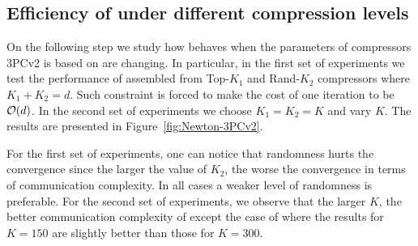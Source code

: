 \documentclass[11pt]{article}
\begin{document}
	\subsection{Efficiency of  under different compression levels}
	
	On the following step we study how  behaves when the parameters of compressors 3PCv2 is based on are changing. In particular, in the first set of experiments we test the performance of  assembled from Top-$K_1$ and Rand-$K_2$ compressors where $K_1+K_2=d$. Such constraint is forced to make the cost of one iteration to be $\mathcal{O}(d)$. In the second set of experiments we choose $K_1=K_2=K$ and vary $K$. The results are presented in Figure~\ref{fig:Newton-3PCv2}. 
	
	For the first set of experiments, one can notice that randomness hurts the convergence since the larger the value of $K_2$, the worse the convergence in terms of communication complexity. In all cases a weaker level of randomness is preferable. For the second set of experiments, we observe that the larger $K$, the better communication complexity of  except the case of  where the results for $K=150$  are slightly better than those for $K=300$. 
	
\end{document}
